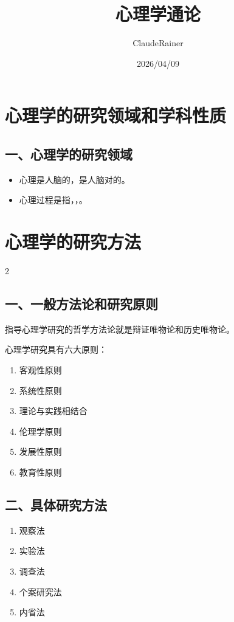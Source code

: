 \documentclass[b5paper,11pt]{article}
\title{心理学通论}
\date{2026/04/09}
\author{ClaudeRainer}
\begin{document}
\maketitle

\section{心理学的研究领域和学科性质}

\subsection*{一、心理学的研究领域}
\begin{itemize}
  \item [-] 心理是人脑的，是人脑对的。
  \item [-] 心理过程是指，，。
\end{itemize}

\begingroup
{}
\section{心理学的研究方法}
\setlength{\columnsep}{1em}
\begin{paracol}{2}
  \subsection*{一、一般方法论和研究原则}
  指导心理学研究的哲学方法论就是辩证唯物论和历史唯物论。

  心理学研究具有六大原则：
  \begin{enumerate}
    \item 客观性原则
    \item 系统性原则
    \item 理论与实践相结合
    \item 伦理学原则
    \item 发展性原则
    \item 教育性原则
  \end{enumerate}

  \switchcolumn
  \subsection*{二、具体研究方法}
  \begin{enumerate}
    \item 观察法
    \item 实验法
    \item 调查法
    \item 个案研究法
    \item 内省法
  \end{enumerate}
\end{paracol}
\endgroup
\end{document}
